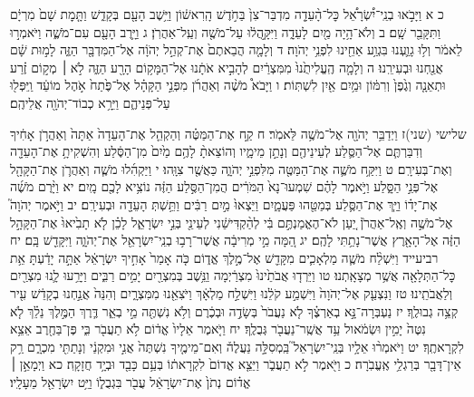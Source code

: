 \documentclass[twoside, openany, parskip=half, 11pt]{book}
\begin{document}
כ א וַיָּבֹ֣אוּ בְנֵֽי־יִ֠שְׂרָאֵ֠ל כׇּל־הָ֨עֵדָ֤ה מִדְבַּר־צִן֙ בַּחֹ֣דֶשׁ הָֽרִאשׁ֔וֹן וַיֵּ֥שֶׁב הָעָ֖ם בְּקָדֵ֑שׁ וַתָּ֤מׇת שָׁם֙ מִרְיָ֔ם וַתִּקָּבֵ֖ר שָֽׁם׃ ב וְלֹא־הָ֥יָה מַ֖יִם לָעֵדָ֑ה וַיִּקָּ֣הֲל֔וּ עַל־מֹשֶׁ֖ה וְעַֽל־אַהֲרֹֽן׃ ג וַיָּ֥רֶב הָעָ֖ם עִם־מֹשֶׁ֑ה וַיֹּאמְר֣וּ לֵאמֹ֔ר וְל֥וּ גָוַ֛עְנוּ בִּגְוַ֥ע אַחֵ֖ינוּ לִפְנֵ֥י יְהֹוָה׃ ד וְלָמָ֤ה הֲבֵאתֶם֙ אֶת־קְהַ֣ל יְהֹוָ֔ה אֶל־הַמִּדְבָּ֖ר הַזֶּ֑ה לָמ֣וּת שָׁ֔ם אֲנַ֖חְנוּ וּבְעִירֵֽנוּ׃ ה וְלָמָ֤ה הֶֽעֱלִיתֻ֙נוּ֙ מִמִּצְרַ֔יִם לְהָבִ֣יא אֹתָ֔נוּ אֶל־הַמָּק֥וֹם הָרָ֖ע הַזֶּ֑ה לֹ֣א ׀ מְק֣וֹם זֶ֗רַע וּתְאֵנָ֤ה וְגֶ֙פֶן֙ וְרִמּ֔וֹן וּמַ֥יִם אַ֖יִן לִשְׁתּֽוֹת׃ ו וַיָּבֹא֩ מֹשֶׁ֨ה וְאַהֲרֹ֜ן מִפְּנֵ֣י הַקָּהָ֗ל אֶל־פֶּ֙תַח֙ אֹ֣הֶל מוֹעֵ֔ד וַֽיִּפְּל֖וּ עַל־פְּנֵיהֶ֑ם וַיֵּרָ֥א כְבוֹד־יְהֹוָ֖ה אֲלֵיהֶֽם׃

שלישי (שני)ז וַיְדַבֵּ֥ר יְהֹוָ֖ה אֶל־מֹשֶׁ֥ה לֵּאמֹֽר׃ ח קַ֣ח אֶת־הַמַּטֶּ֗ה וְהַקְהֵ֤ל אֶת־הָעֵדָה֙ אַתָּה֙ וְאַהֲרֹ֣ן אָחִ֔יךָ וְדִבַּרְתֶּ֧ם אֶל־הַסֶּ֛לַע לְעֵינֵיהֶ֖ם וְנָתַ֣ן מֵימָ֑יו וְהוֹצֵאתָ֨ לָהֶ֥ם מַ֙יִם֙ מִן־הַסֶּ֔לַע וְהִשְׁקִיתָ֥ אֶת־הָעֵדָ֖ה וְאֶת־בְּעִירָֽם׃ ט וַיִּקַּ֥ח מֹשֶׁ֛ה אֶת־הַמַּטֶּ֖ה מִלִּפְנֵ֣י יְהֹוָ֑ה כַּאֲשֶׁ֖ר צִוָּֽהוּ׃ י וַיַּקְהִ֜לוּ מֹשֶׁ֧ה וְאַהֲרֹ֛ן אֶת־הַקָּהָ֖ל אֶל־פְּנֵ֣י הַסָּ֑לַע וַיֹּ֣אמֶר לָהֶ֗ם שִׁמְעוּ־נָא֙ הַמֹּרִ֔ים הֲמִן־הַסֶּ֣לַע הַזֶּ֔ה נוֹצִ֥יא לָכֶ֖ם מָֽיִם׃ יא וַיָּ֨רֶם מֹשֶׁ֜ה אֶת־יָד֗וֹ וַיַּ֧ךְ אֶת־הַסֶּ֛לַע בְּמַטֵּ֖הוּ פַּעֲמָ֑יִם וַיֵּצְאוּ֙ מַ֣יִם רַבִּ֔ים וַתֵּ֥שְׁתְּ הָעֵדָ֖ה וּבְעִירָֽם׃
יב וַיֹּ֣אמֶר יְהֹוָה֮ אֶל־מֹשֶׁ֣ה וְאֶֽל־אַהֲרֹן֒ יַ֚עַן לֹא־הֶאֱמַנְתֶּ֣ם בִּ֔י לְהַ֨קְדִּישֵׁ֔נִי לְעֵינֵ֖י בְּנֵ֣י יִשְׂרָאֵ֑ל לָכֵ֗ן לֹ֤א תָבִ֙יאוּ֙ אֶת־הַקָּהָ֣ל הַזֶּ֔ה אֶל־הָאָ֖רֶץ אֲשֶׁר־נָתַ֥תִּי לָהֶֽם׃ יג הֵ֚מָּה מֵ֣י מְרִיבָ֔ה אֲשֶׁר־רָב֥וּ בְנֵֽי־יִשְׂרָאֵ֖ל אֶת־יְהֹוָ֑ה וַיִּקָּדֵ֖שׁ בָּֽם׃
יח רביעייד וַיִּשְׁלַ֨ח מֹשֶׁ֧ה מַלְאָכִ֛ים מִקָּדֵ֖שׁ אֶל־מֶ֣לֶךְ אֱד֑וֹם כֹּ֤ה אָמַר֙ אָחִ֣יךָ יִשְׂרָאֵ֔ל אַתָּ֣ה יָדַ֔עְתָּ אֵ֥ת כׇּל־הַתְּלָאָ֖ה אֲשֶׁ֥ר מְצָאָֽתְנוּ׃ טו וַיֵּרְד֤וּ אֲבֹתֵ֙ינוּ֙ מִצְרַ֔יְמָה וַנֵּ֥שֶׁב בְּמִצְרַ֖יִם יָמִ֣ים רַבִּ֑ים וַיָּרֵ֥עוּ לָ֛נוּ מִצְרַ֖יִם וְלַאֲבֹתֵֽינוּ׃ טז וַנִּצְעַ֤ק אֶל־יְהֹוָה֙ וַיִּשְׁמַ֣ע קֹלֵ֔נוּ וַיִּשְׁלַ֣ח מַלְאָ֔ךְ וַיֹּצִאֵ֖נוּ מִמִּצְרָ֑יִם וְהִנֵּה֙ אֲנַ֣חְנוּ בְקָדֵ֔שׁ עִ֖יר קְצֵ֥ה גְבוּלֶֽךָ׃ יז נַעְבְּרָה־נָּ֣א בְאַרְצֶ֗ךָ לֹ֤א נַעֲבֹר֙ בְּשָׂדֶ֣ה וּבְכֶ֔רֶם וְלֹ֥א נִשְׁתֶּ֖ה מֵ֣י בְאֵ֑ר דֶּ֧רֶךְ הַמֶּ֣לֶךְ נֵלֵ֗ךְ לֹ֤א נִטֶּה֙ יָמִ֣ין וּשְׂמֹ֔אול עַ֥ד אֲשֶֽׁר־נַעֲבֹ֖ר גְּבֻלֶֽךָ׃ יח וַיֹּ֤אמֶר אֵלָיו֙ אֱד֔וֹם לֹ֥א תַעֲבֹ֖ר בִּ֑י פֶּן־בַּחֶ֖רֶב אֵצֵ֥א לִקְרָאתֶֽךָ׃ יט וַיֹּאמְר֨וּ אֵלָ֥יו בְּנֵֽי־יִשְׂרָאֵל֮ בַּֽמְסִלָּ֣ה נַעֲלֶה֒ וְאִם־מֵימֶ֤יךָ נִשְׁתֶּה֙ אֲנִ֣י וּמִקְנַ֔י וְנָתַתִּ֖י מִכְרָ֑ם רַ֥ק אֵין־דָּבָ֖ר בְּרַגְלַ֥י אֶֽעֱבֹֽרָה׃ כ וַיֹּ֖אמֶר לֹ֣א תַעֲבֹ֑ר וַיֵּצֵ֤א אֱדוֹם֙ לִקְרָאת֔וֹ בְּעַ֥ם כָּבֵ֖ד וּבְיָ֥ד חֲזָקָֽה׃ כא וַיְמָאֵ֣ן ׀ אֱד֗וֹם נְתֹן֙ אֶת־יִשְׂרָאֵ֔ל עֲבֹ֖ר בִּגְבֻל֑וֹ וַיֵּ֥ט יִשְׂרָאֵ֖ל מֵעָלָֽיו׃
\end{document}
